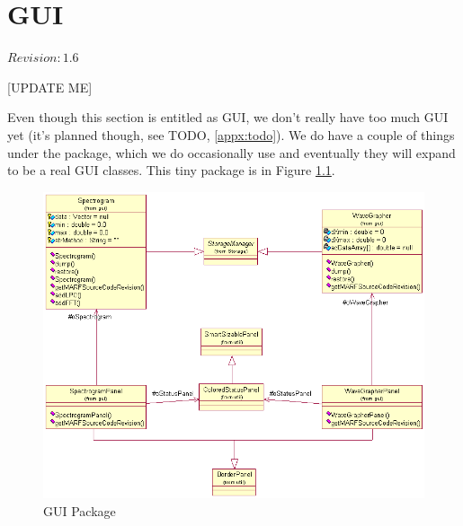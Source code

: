 \chapter{GUI}

$Revision: 1.6 $

[UPDATE ME]

Even though this section is entitled as GUI, we don't
really have too much GUI yet (it's planned though,
see TODO, \ref{appx:todo}). We do have a couple
of things under the  package, which we do
occasionally use and eventually they will expand to be a real
GUI classes. This tiny package is in Figure \ref{fig:gui}.

{\todo}

\begin{figure}
	\centering
	\includegraphics[width=\textwidth]{../graphics/arch/gui.png}
	\caption{GUI Package}
	\label{fig:gui}
\end{figure}





